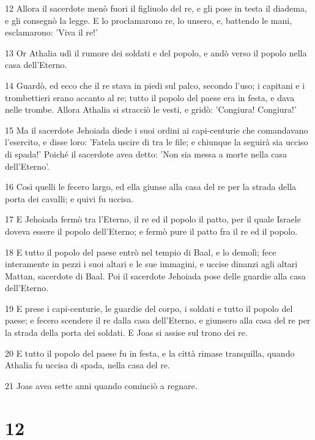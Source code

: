 \par 12 Allora il sacerdote menò fuori il figliuolo del re, e gli pose in testa il diadema, e gli consegnò la legge. E lo proclamarono re, lo unsero, e, battendo le mani, esclamarono: 'Viva il re!'
\par 13 Or Athalia udì il rumore dei soldati e del popolo, e andò verso il popolo nella casa dell'Eterno.
\par 14 Guardò, ed ecco che il re stava in piedi sul palco, secondo l'uso; i capitani e i trombettieri erano accanto al re; tutto il popolo del paese era in festa, e dava nelle trombe. Allora Athalia si stracciò le vesti, e gridò: 'Congiura! Congiura!'
\par 15 Ma il sacerdote Jehoiada diede i suoi ordini ai capi-centurie che comandavano l'esercito, e disse loro: 'Fatela uscire di tra le file; e chiunque la seguirà sia ucciso di spada!' Poiché il sacerdote avea detto: 'Non sia messa a morte nella casa dell'Eterno'.
\par 16 Così quelli le fecero largo, ed ella giunse alla casa del re per la strada della porta dei cavalli; e quivi fu uccisa.
\par 17 E Jehoiada fermò tra l'Eterno, il re ed il popolo il patto, per il quale Israele doveva essere il popolo dell'Eterno; e fermò pure il patto fra il re ed il popolo.
\par 18 E tutto il popolo del paese entrò nel tempio di Baal, e lo demolì; fece interamente in pezzi i suoi altari e le sue immagini, e uccise dinanzi agli altari Mattan, sacerdote di Baal. Poi il sacerdote Jehoiada pose delle guardie alla casa dell'Eterno.
\par 19 E prese i capi-centurie, le guardie del corpo, i soldati e tutto il popolo del paese; e fecero scendere il re dalla casa dell'Eterno, e giunsero alla casa del re per la strada della porta dei soldati. E Joas si assise sul trono dei re.
\par 20 E tutto il popolo del paese fu in festa, e la città rimase tranquilla, quando Athalia fu uccisa di spada, nella casa del re.
\par 21 Joas avea sette anni quando cominciò a regnare.

\chapter{12}


